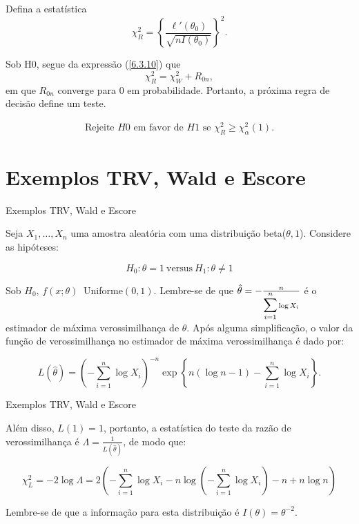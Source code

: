 \documentclass[12pt]{beamer}
\begin{document}
\begin{frame}{}
\begin{block}{}
\justifying
Defina a estatística
\[
\chi^2_R = \left\{\frac{\ell'(\theta_{0})}{\sqrt{nI(\theta_0)}}\right\}^2. 
\]

Sob H0, segue da expressão (\ref{6.3.10}) que
\[
\chi^2_R = \chi^2_W + R_{0n},
\]
em que $R_{0n}$ converge para $0$ em probabilidade. Portanto, a próxima regra de decisão define um teste.
\end{block}
\pause
\begin{block}{}
\justifying
\begin{align}\label{6.3.20}
    \text{Rejeite } H0 \text{ em favor de } H1 \text{ se } \chi^2_R \geq \chi^2_\alpha(1).
\end{align}
\end{block}
\end{frame}

\section{Exemplos TRV, Wald e Escore}
\begin{frame}{Exemplos TRV, Wald e Escore}
\begin{block}{}
\justifying
Seja \(X_1, \ldots, X_n\) uma amostra aleatória com uma distribuição beta(\(\theta, 1\)). Considere as hipóteses: 

$$H_0: \theta = 1~ \text{versus}~ H_1: \theta \neq 1$$
\end{block}
\pause
\begin{block}{}
\justifying
Sob \(H_0\), \(f(x; \theta)~\) Uniforme\((0, 1)\). Lembre-se de que \(\hat{\theta} = -\frac{n}{{\displaystyle \sum_{i=1}^{n}} \log X_i}\) é o estimador de máxima verossimilhança de \(\theta\). Após alguma simplificação, o valor da função de verossimilhança no estimador de máxima verossimilhança é dado por:

\[L(\hat{\theta}) = \left(- \sum_{i=1}^n \log X_i\right)^{-n}\exp\left\{n(\log n - 1) - \sum_{i=1}^n \log X_i\right\}.\] 
\end{block}
\end{frame}

\begin{frame}{Exemplos TRV, Wald e Escore}
\begin{block}{}
\justifying
Além disso, \(L(1) = 1\), portanto, a estatística do teste da razão de verossimilhança é \(\Lambda = \frac{1}{L(\hat{\theta})}\), de modo que:

{\small
\[\chi^2_L = -2 \log \Lambda = 2\left(- \sum_{i=1}^n \log X_i - n \log\left(-\sum_{i=1}^n \log X_i\right) - n + n \log n\right)\]
}

Lembre-se de que a informação para esta distribuição é \(I(\theta) = \theta^{-2}\). 
\end{block}
\end{frame}
\end{document}

